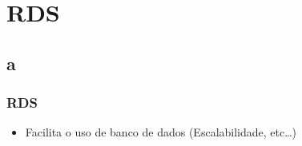\section{RDS}

\subsection{a}

\begin{frame}
	\frametitle{RDS}
	\begin{itemize}
		\item Facilita o uso de banco de dados (Escalabilidade, etc\dots)
	\end{itemize}
\end{frame}
